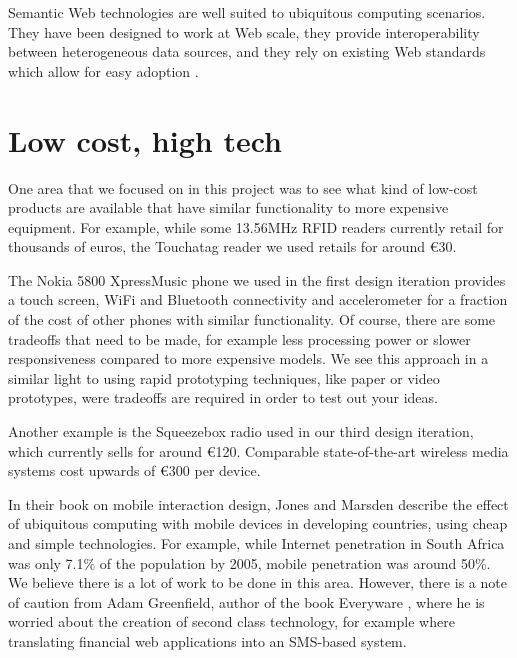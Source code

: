 Semantic Web technologies are well suited to ubiquitous computing scenarios. They have been designed to work at Web scale, they provide interoperability between heterogeneous data sources, and they rely on existing Web standards which allow for easy adoption \cite{Sabou2010}.

\section{Low cost, high tech}

One area that we focused on in this project was to see what kind of low-cost products are available that have similar functionality to more expensive equipment. For example, while some 13.56MHz \ac{RFID} readers currently retail for thousands of euros, the Touchatag reader we used retails for around \euro 30.  

The Nokia 5800 XpressMusic phone we used in the first design iteration provides a touch screen, WiFi and Bluetooth connectivity and accelerometer for a fraction of the cost of other phones with similar functionality. Of course, there are some tradeoffs that need to be made, for example less processing power or slower responsiveness compared to more expensive models. We see this approach in a similar light to using rapid prototyping techniques, like paper or video prototypes, were tradeoffs are required in order to test out your ideas.

Another example is the Squeezebox radio used in our third design iteration, which currently sells for around \euro 120. Comparable state-of-the-art wireless media systems cost upwards of \euro 300 per device.

In their book on mobile interaction design, Jones and Marsden \cite{Jones2006} describe the effect of ubiquitous computing with mobile devices in developing countries, using cheap and simple technologies.  For example, while Internet penetration in South Africa was only 7.1\% of the population by 2005, mobile penetration was around 50\%. We believe there is a lot of work to be done in this area. However, there is a note of caution from Adam Greenfield, author of the book Everyware \cite{Greenfield2006}, where he is worried about the creation of second class technology, for example where translating financial web applications into an SMS-based system.


